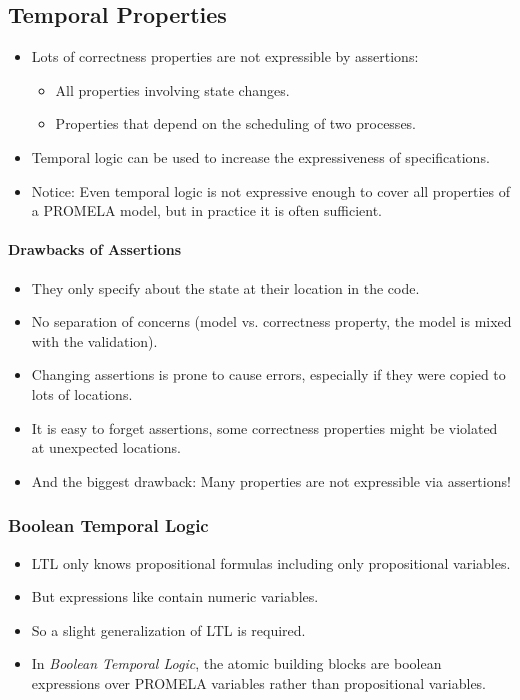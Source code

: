 		\subsection{Temporal Properties}
			\begin{itemize}
				\item Lots of correctness properties are not expressible by assertions:
					\begin{itemize}
						\item All properties involving state changes.
						\item Properties that depend on the scheduling of two processes.
					\end{itemize}
				\item Temporal logic can be used to increase the expressiveness of specifications.
				\item Notice: Even temporal logic is not expressive enough to cover all properties of a PROMELA model, but in practice it is often sufficient.
			\end{itemize}

			\paragraph{Drawbacks of Assertions}
				\begin{itemize}
					\item They only specify about the state at their location in the code.
					\item No separation of concerns (model vs. correctness property, the model is mixed with the validation).
					\item Changing assertions is prone to cause errors, especially if they were copied to lots of locations.
					\item It is easy to forget assertions, some correctness properties might be violated at unexpected locations.
					\item And the biggest drawback: Many properties are not expressible via assertions!
				\end{itemize}

			\subsubsection{Boolean Temporal Logic}
				\begin{itemize}
					\item LTL only knows propositional formulas including only propositional variables.
					\item But expressions like  contain numeric variables.
					\item So a slight generalization of LTL is required.
					\item In \textit{Boolean Temporal Logic}, the atomic building blocks are boolean expressions over PROMELA variables rather than propositional variables.
				\end{itemize}


